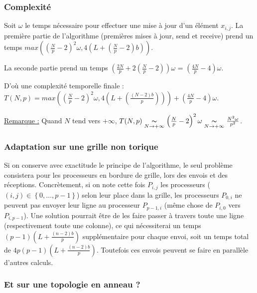 \documentclass{article}
\begin{document}
\subsubsection*{Complexité}

Soit $\omega$ le temps nécessaire pour effectuer une mise à jour d'un élément $x_{i,j}$.
La première partie de l'algorithme (premières mises à jour, send et receive) prend un temps $max \left( (\frac{N}{p}-2)^2\omega, 4(L + (\frac{N}{p}-2)b) \right) $.

La seconde partie prend un temps $(\frac{2N}{p} + 2(\frac{N}{p}-2))\omega$ = $(\frac{4N}{p}-4)\omega$.

D'où une complexité temporelle finale : $T(N,p) = max \left( \left(\frac{N}{p}-2\right)^2\omega, 4\left(L + \left(\frac{(N-2)b}{p}\right) \right) \right)  + \left(\frac{4N}{p}-4 \right)\omega $.

\underline{Remarque :} Quand $N$ tend vers $+\infty$, $T(N,p) \underset{N \rightarrow +\infty}{\thicksim} \left(\frac{N}{p}-2\right)^2\omega \underset{N \rightarrow +\infty}{\thicksim} \frac{N^2\omega}{p^2}$. 

\subsubsection*{Adaptation sur une grille non torique}

Si on conserve avec exactitude le principe de l'algorithme, le seul problème consistera pour les processeurs en bordure de grille, lors des envois et des réceptions.
Concrètement, si on note cette fois $P_{i,j}$ les processeurs ($(i,j) \in \left\{ 0, \dots,p-1\right\}$) selon leur place dans la grille, les processeurs $P_{0,i}$ ne peuvent pas envoyer leur ligne au processeur $P_{p-1,i}$ (même chose de $P_{i,0}$ vers $P_{i,p-1}$).
Une solution pourrait être de les faire passer à travers toute une ligne (respectivement toute une colonne), ce qui nécessiterai un temps $(p-1)(L + \frac{(n-2)b}{p})$ supplémentaire pour chaque envoi, soit un temps total de $4p(p-1)(L + \frac{(n-2)b}{p})$. Toutefois ces envois peuvent se faire en parallèle d'autres calculs. %

\subsubsection*{Et sur une topologie en anneau ?}
\end{document}
